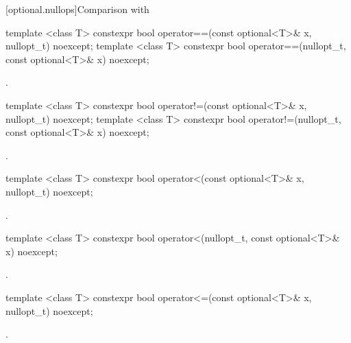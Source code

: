 [optional.nullops]{Comparison with }

%
\begin{itemdecl}
template <class T> constexpr bool operator==(const optional<T>& x, nullopt_t) noexcept;
template <class T> constexpr bool operator==(nullopt_t, const optional<T>& x) noexcept;
\end{itemdecl}

\begin{itemdescr}
\pnum
\returns
{}.
\end{itemdescr}

%
\begin{itemdecl}
template <class T> constexpr bool operator!=(const optional<T>& x, nullopt_t) noexcept;
template <class T> constexpr bool operator!=(nullopt_t, const optional<T>& x) noexcept;
\end{itemdecl}

\begin{itemdescr}
\pnum
\returns
{}.
\end{itemdescr}

%
\begin{itemdecl}
template <class T> constexpr bool operator<(const optional<T>& x, nullopt_t) noexcept;
\end{itemdecl}

\begin{itemdescr}
\pnum
\returns
{}.
\end{itemdescr}

%
\begin{itemdecl}
template <class T> constexpr bool operator<(nullopt_t, const optional<T>& x) noexcept;
\end{itemdecl}

\begin{itemdescr}
\pnum
\returns
{}.
\end{itemdescr}

%
\begin{itemdecl}
template <class T> constexpr bool operator<=(const optional<T>& x, nullopt_t) noexcept;
\end{itemdecl}

\begin{itemdescr}
\pnum
\returns
{}.
\end{itemdescr}

